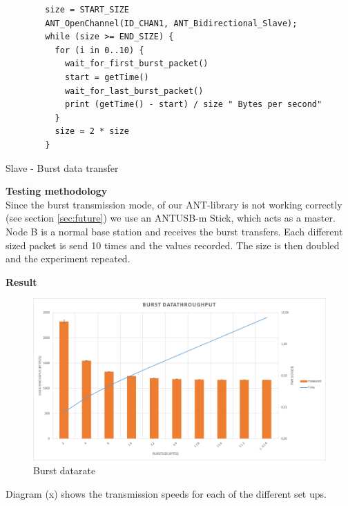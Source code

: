 \begin{description}
	\begin{code}
		\begin{verbatim}
		size = START_SIZE
		ANT_OpenChannel(ID_CHAN1, ANT_Bidirectional_Slave);		
		while (size >= END_SIZE) {
		  for (i in 0..10) {
		    wait_for_first_burst_packet()
		    start = getTime()
		    wait_for_last_burst_packet()
		    print (getTime() - start) / size " Bytes per second"
		  }
		  size = 2 * size
		}
		\end{verbatim}
		\caption{Slave - Burst data transfer}\label{lst:sExp5}
	\end{code}
	\item{\textbf{Testing methodology}} \hfill \\ Since the burst transmission mode, of our ANT-library is not working correctly (see section \ref{sec:future}) we use an ANTUSB-m Stick, which acts as a master. Node B is a normal base station and receives the burst transfers. Each different sized packet is send 10 times and the values recorded. The size is then doubled and the experiment repeated.
	\item{\textbf{Result}} \hfill \\ 
		\begin{figure}[h]
			\centering
			\includegraphics[scale=0.5]{./pics/exp5.png}
			\caption{Burst datarate}\label{fig:exp5}
		\end{figure}
	 Diagram (x) shows the transmission speeds for each of the different set ups.
\end{description}
\newpage

